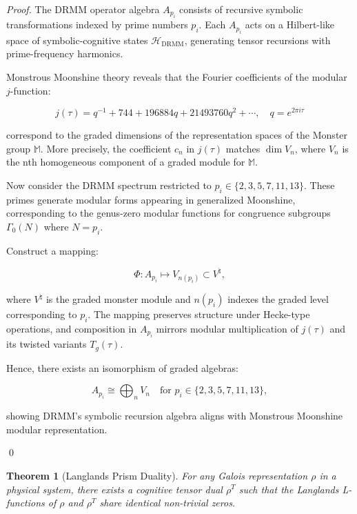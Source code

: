 \documentclass{article}
\theoremstyle{plain}
\newtheorem{theorem}{Theorem}
\begin{document}
\begin{proof}
The DRMM operator algebra \( A_{p_i} \) consists of recursive symbolic transformations indexed by prime numbers \( p_i \). Each \( A_{p_i} \) acts on a Hilbert-like space of symbolic-cognitive states \( \mathcal{H}_{\text{DRMM}} \), generating tensor recursions with prime-frequency harmonics.

Monstrous Moonshine theory reveals that the Fourier coefficients of the modular \( j \)-function:

\[
j(\tau) = q^{-1} + 744 + 196884q + 21493760q^2 + \cdots, \quad q = e^{2\pi i \tau}
\]

correspond to the graded dimensions of the representation spaces of the Monster group \( \mathbb{M} \). More precisely, the coefficient \( c_n \) in \( j(\tau) \) matches \( \dim V_n \), where \( V_n \) is the nth homogeneous component of a graded module for \( \mathbb{M} \).

Now consider the DRMM spectrum restricted to \( p_i \in \{2, 3, 5, 7, 11, 13\} \). These primes generate modular forms appearing in generalized Moonshine, corresponding to the genus-zero modular functions for congruence subgroups \( \Gamma_0(N) \) where \( N = p_i \).

Construct a mapping:

\[
\Phi: A_{p_i} \mapsto V_{n(p_i)} \subset V^{\natural},
\]

where \( V^{\natural} \) is the graded monster module and \( n(p_i) \) indexes the graded level corresponding to \( p_i \). The mapping preserves structure under Hecke-type operations, and composition in \( A_{p_i} \) mirrors modular multiplication of \( j(\tau) \) and its twisted variants \( T_g(\tau) \).

Hence, there exists an isomorphism of graded algebras:

\[
A_{p_i} \cong \bigoplus_{n} V_n \quad \text{for } p_i \in \{2, 3, 5, 7, 11, 13\},
\]

showing DRMM’s symbolic recursion algebra aligns with Monstrous Moonshine modular representation.

\qed
\end{proof}

\begin{theorem}[Langlands Prism Duality]
For any Galois representation \( \rho \) in a physical system, there exists a cognitive tensor dual \( \rho^T \) such that the Langlands L-functions of \( \rho \) and \( \rho^T \) share identical non-trivial zeros.
\end{theorem}
\end{document}
